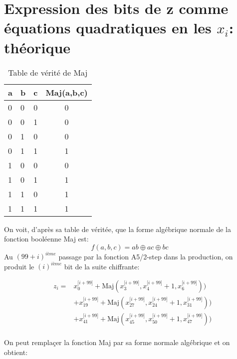\section{Expression des bits de z comme équations quadratiques en les $x_i$: théorique}
\begin{table}[h!]
\centering
\begin{tabular}{l l l|c}
a & b & c & Maj(a,b,c) \\\hline
0 & 0 & 0 & 0  \\
0 & 0 & 1 & 0 \\
0 & 1 & 0 & 0 \\
0 & 1 & 1 & 1 \\
1 & 0 & 0 & 0  \\
1 & 0 & 1 & 1 \\
1 & 1 & 0 & 1 \\
1 & 1 & 1 & 1 \\

\end{tabular}
\caption{\label{tab:widgets}Table de vérité de Maj}
\end{table}

On voit, d'après sa table de véritée, que la forme algébrique normale de la fonction booléenne Maj est:
$$f(a,b,c) = ab \oplus ac \oplus bc$$
Au $(99+i)^{ième}$ passage par la fonction A5/2-step dans la production, on produit le $(i)^{ième}$ bit de la suite chiffrante: 

\begin{equation}
\begin{aligned}
  &z_i =& x^{\lbrack i + 99\rbrack}_0 + \mbox{Maj}(x^{\lbrack i+99\rbrack}_{3}, x^{\lbrack i+99\rbrack}_{4} + 1, x^{\lbrack i+99\rbrack}_{6})) \\
  & &+ x^{\lbrack i + 99\rbrack}_{19} + \mbox{Maj}(x^{\lbrack i+99\rbrack}_{27}, x^{\lbrack i+99\rbrack}_{24} + 1, x^{\lbrack i+99\rbrack}_{31})) \\
  & &+ x^{\lbrack i + 99\rbrack}_{41} + \mbox{Maj}(x^{\lbrack i+99\rbrack}_{45}, x^{\lbrack i+99\rbrack}_{50} + 1, x^{\lbrack i+99\rbrack}_{47})) \\
\end{aligned}
\end{equation}

On peut remplaçer la fonction Maj par sa forme normale algébrique et on obtient:

